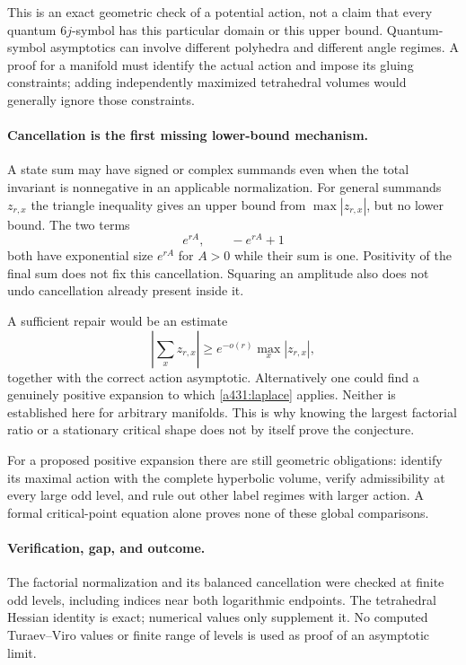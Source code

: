 \documentclass[11pt]{article}
\begin{document}
This is an exact geometric check of a potential
action, not a claim that every quantum $6j$-symbol
has this particular domain or this upper bound.
Quantum-symbol asymptotics can involve different
polyhedra and different angle regimes. A proof
for a manifold must identify the actual action
and impose its gluing constraints; adding
independently maximized tetrahedral volumes
would generally ignore those constraints.

\paragraph{Cancellation is the first missing lower-bound mechanism.}
A state sum may have signed or complex summands even
when the total invariant is nonnegative in an
applicable normalization. For general summands
$z_{r,x}$ the triangle inequality gives an upper
bound from $\max|z_{r,x}|$, but no lower bound.
The two terms
\[
                    e^{rA},\qquad -e^{rA}+1
\]
both have exponential size $e^{rA}$ for $A>0$
while their sum is one. Positivity of the
final sum does not fix this cancellation.
Squaring an amplitude also does not undo
cancellation already present inside it.

A sufficient repair would be an estimate
\[
 \left|\sum_xz_{r,x}\right|
               \geq e^{-o(r)}\max_x|z_{r,x}|,
\]
together with the correct action asymptotic.
Alternatively one could find a genuinely
positive expansion to which
\eqref{a431:laplace} applies. Neither is
established here for arbitrary manifolds.
This is why knowing the largest factorial
ratio or a stationary critical shape does
not by itself prove the conjecture.

For a proposed positive expansion there are
still geometric obligations: identify its
maximal action with the complete hyperbolic
volume, verify admissibility at every large
odd level, and rule out other label regimes
with larger action. A formal critical-point
equation alone proves none of these global
comparisons.

\paragraph{Verification, gap, and outcome.}
The factorial normalization and its balanced
cancellation were checked at finite odd
levels, including indices near both
logarithmic endpoints. The tetrahedral
Hessian identity is exact; numerical values
only supplement it. No computed Turaev--Viro
values or finite range of levels is used
as proof of an asymptotic limit.
\end{document}
